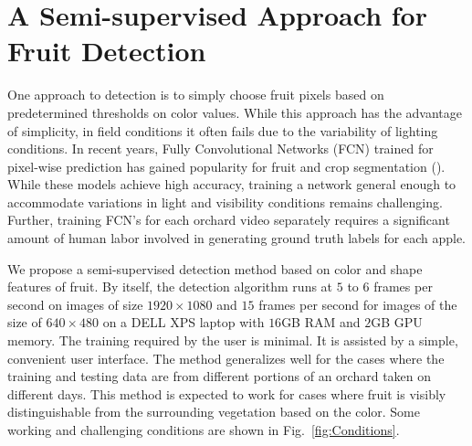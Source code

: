 \section{A Semi-supervised Approach for Fruit Detection}\label{sec:segmentation}

One approach to detection is to simply choose fruit pixels based on predetermined thresholds on color values. While this approach has the advantage of simplicity, in field conditions it often fails due to the variability of lighting conditions. In recent years,  Fully Convolutional Networks (FCN) trained for pixel-wise prediction has gained popularity for fruit and crop segmentation (\cite{chen2017counting}). While these models achieve high accuracy, training a network general enough to accommodate variations in light and visibility conditions remains challenging. Further, training FCN’s for each orchard video separately requires a significant amount of human labor involved in generating ground truth labels for each apple.

We propose a semi-supervised detection method based on color and shape features of fruit. By itself, the detection algorithm runs at $5$ to $6$ frames per second on images of size $1920 \times 1080$ and $15$ frames per second for images of the size of $640 \times 480$ on a DELL XPS laptop with $16$GB RAM and $2$GB GPU memory. The training required by the user is minimal. It is assisted by a simple, convenient user interface. The method generalizes well for the cases where the training and testing data are from different portions of an orchard taken on different days. This method is expected to work for cases where fruit is visibly distinguishable from the surrounding vegetation based on the color. Some working and challenging conditions are shown in Fig.~\ref{fig:Conditions}. 

